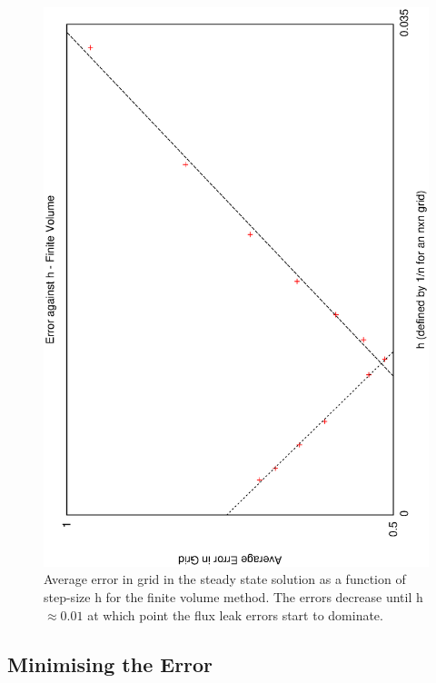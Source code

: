 \documentclass[aps,twocolumn,pre,nofootinbib,10pt]{revtex4-1}
\begin{document}
\begin{figure}
\includegraphics[height=\breite \columnwidth,angle=-90]{fv_h.eps}

\caption{Average error in grid in the steady state solution as a function of step-size h for the finite volume method. The errors decrease until h$\approx 0.01$ at which point the flux leak errors start to dominate.}
\label{fig:fv_opt}
\end{figure}

\subsection{Minimising the Error}
\end{document}
